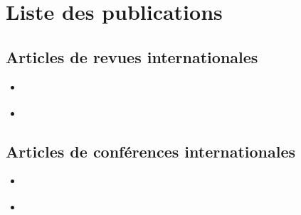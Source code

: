 \newpage
\section*{Liste des publications}

\subsection*{Articles de revues internationales}

\begin{itemize}
	\item {} \cite{Rajaona2015}
	\item {} \cite{Nguyen2016b}
\end{itemize}

\subsection*{Articles de conférences internationales}
\begin{itemize}
	\item {} \cite{Rajaona2014}
	\item {} \cite{Rajaona2016}
\end{itemize}

\afterpage{\blankpage}
